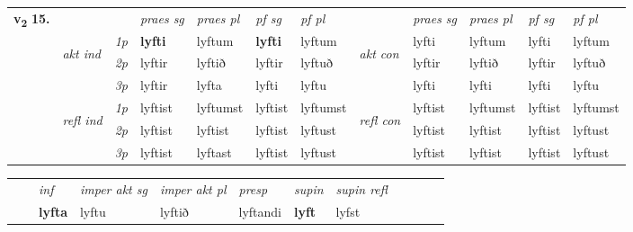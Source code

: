 \begin{tabular}{llllllllllll} \toprule
\multirow{4}{*}{{{\textbf{v{\textsubscript{2}}} \Large{\textbf{15.}}}}}  & &   &  \textit{praes sg}  & \textit{praes pl}  &\textit{ pf sg} & \textit{pf pl} &  &  \textit{praes sg}  & \textit{praes pl}  & \textit{pf sg} & \textit{pf pl } \\*
	\cmidrule{4-7} \cmidrule{9-12}
 & \multirow{3}{*}{\begin{turn}{90}\textit{akt ind}\end{turn}} & {\textit{1p}} & \textbf{lyfti} & lyftum    & \textbf{lyfti} & lyftum & \multirow{3}{*}{\begin{turn}{90}\textit{akt con}\end{turn}} &lyfti & lyftum & lyfti & lyftum\\*
& &  {\textit{2p}} &  lyftir  & lyftið   & lyftir & lyftuð & & lyftir & lyftið & lyftir & lyftuð \\*
& &  {\textit{3p}} & lyftir & lyfta   & lyfti & lyftu & & lyfti & lyfti& lyfti & lyftu  \\*
\cmidrule{4-7} \cmidrule{9-12}
 &\multirow{3}{*}{\begin{turn}{90}\textit{refl ind}\end{turn}} & {\textit{1p}} & lyftist & lyftumst    & lyftist & lyftumst & \multirow{3}{*}{\begin{turn}{90}\textit{refl con}\end{turn}}  &lyftist & lyftumst & lyftist & lyftumst\\*
 &&  {\textit{2p}} &  lyftist  & lyftist   & lyftist & lyftust & &lyftist & lyftist & lyftist & lyftust \\*
& &  {\textit{3p}} & lyftist & lyftast   & lyftist & lyftust & & lyftist & lyftist& lyftist & lyftust  \\*
\cmidrule{4-7} \cmidrule{9-12}
\end{tabular}


\begin{tabular}{llllllllllll}
 & & \textit{inf} & \textit{imper akt sg} & \textit{imper akt pl}   & \textit{presp} & \textit{supin} & \textit{supin refl}      \\*
  & & \textbf{lyfta} & lyftu  & lyftið   & lyftandi &  \textbf{lyft} & lyfst  \\*
\cmidrule{1-12}
\end{tabular}



